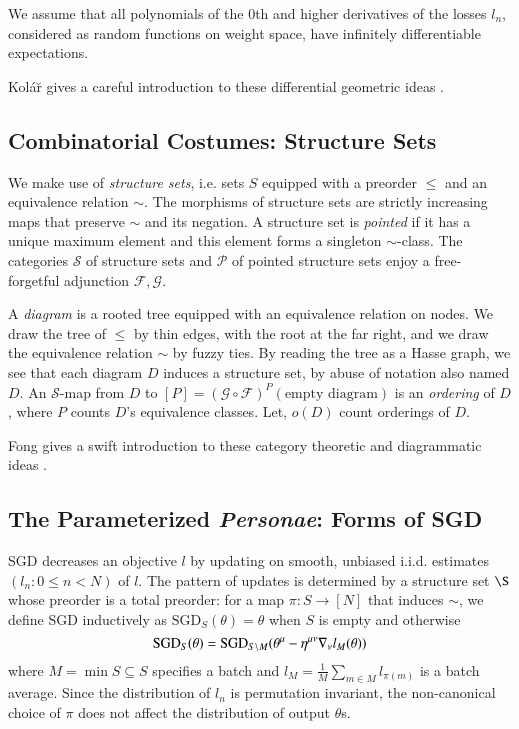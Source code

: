 \documentclass{article}
\newcommand{\Free}{\mathcal{F}}
\newcommand{\Forg}{\mathcal{G}}
\newcommand{\Ss}{\mathcal{S}}
\newcommand{\Pp}{\mathcal{P}}
\newcommand{\SGD}{\text{\textnormal{SGD}}}
\begin{document}
    We assume that all polynomials of the $0$th and higher derivatives of the
    losses $l_n$, considered as random functions on weight space, have
    infinitely differentiable expectations.
    
    Kol\'{a}\u{r} gives a careful introduction to these differential geometric
    ideas .

\subsection{Combinatorial Costumes: Structure Sets}
    We make use of \emph{structure sets}, i.e.  sets $S$ equipped with a
    preorder $\leq$ and an equivalence relation $\sim$.  The morphisms of
    structure sets are strictly increasing maps that preserve $\sim$ and its
    negation.  A structure set is \emph{pointed} if it has a unique maximum
    element and this element forms a singleton $\sim$-class.  The categories
    $\Ss$ of structure sets and $\Pp$ of pointed structure sets enjoy a
    free-forgetful adjunction $\Free, \Forg$.

    A \emph{diagram} is a rooted tree equipped with an equivalence relation on
    nodes.  We draw the tree of $\leq$ by thin edges, with the root at the far
    right, and we draw the equivalence relation $\sim$ by fuzzy ties.  By
    reading the tree as a Hasse graph, we see that each diagram $D$ induces a
    structure set, by abuse of notation also named $D$.  An $\Ss$-map from $D$
    to $[P]=(\Forg\circ\Free)^P(\text{empty diagram})$ is an \emph{ordering} of
    $D$, where $P$ counts $D$'s equivalence classes.
    Let, $o(D)$ count orderings of $D$.

    Fong gives a swift introduction to these category theoretic and
    diagrammatic ideas .
        
\subsection{The Parameterized \emph{Personae}: Forms of SGD}
    SGD decreases an objective $l$ by updating on smooth, unbiased i.i.d.
    estimates $(l_n: 0\leq n<N)$ of $l$.  The pattern of updates is determined
    by a structure set $\S$ whose preorder is a total preorder: for a map $\pi:S\to
    [N]$ that induces $\sim$, we define SGD inductively as
    $\text{SGD}_{S}(\theta) = \theta$ when $S$ is empty and otherwise
    $$
        \SGD_S(\theta) =
            \SGD_{S\setminus M}(\theta^\mu - \eta^{\mu\nu} \nabla_\nu l_{M}(\theta))
    $$
    where $M = \min S \subseteq S$ specifies a batch and $l_M =
    \frac{1}{M} \sum_{m\in M} l_{\pi(m)}$ is a batch average.  Since the
    distribution of $l_n$ is permutation invariant, the non-canonical choice
    of $\pi$ does not affect the distribution of output $\theta$s.
\end{document}
